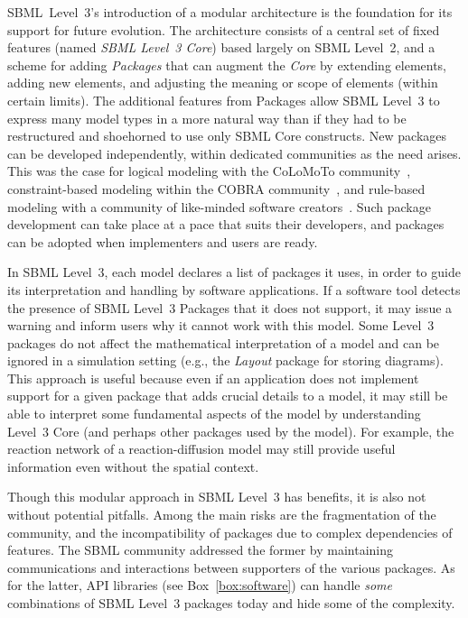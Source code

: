 \documentclass[]{draft-sbml-paper}
\begin{document}
SBML~Level~3's introduction of a modular architecture is the foundation for its support for future evolution.  The architecture consists of a central set of fixed features (named \emph{SBML Level~3 Core}) based largely on SBML Level~2, and a scheme for adding \emph{Packages} that can augment the \emph{Core} by extending elements, adding new elements, and adjusting the meaning or scope of elements (within certain limits). The additional features from Packages allow SBML Level~3 to express many model types in a more natural way than if they had to be restructured and shoehorned to use only SBML Core constructs.  New packages can be developed independently, within dedicated communities as the need arises. This was the case for logical modeling with the CoLoMoTo community~\citep{naldi2015cooperative},  constraint-based modeling within the COBRA community~\citep{Ebrahim2015}, and rule-based modeling with a community of like-minded software creators~\citep{Blinov2004, Danos2004formala, Palmisano2014multistate, Sneddon2011efficient, zhang2013simmune}. Such package development can take place at a pace that suits their developers, and packages can be adopted when implementers and users are ready.

In SBML Level~3, each model declares a list of packages it uses, in order to guide its interpretation and handling by software applications. If a software tool detects the presence of SBML Level~3 Packages that it does not support, it may issue a warning and inform users why it cannot work with this model. Some Level~3 packages do not affect the mathematical interpretation of a model and can be ignored in a simulation setting (e.g., the \emph{Layout} package for storing diagrams).  This approach is useful because even if an application does not implement support for a given package that adds crucial details to a model, it may still be able to interpret some fundamental aspects of the model by understanding Level~3 Core (and perhaps other packages used by the model). For example, the reaction network of a reaction-diffusion model may still provide useful information even without the spatial context.

Though this modular approach in SBML Level~3 has benefits, it is also not without potential pitfalls. Among the main risks are the fragmentation of the community, and the incompatibility of packages due to complex dependencies of features. The SBML community addressed the former by maintaining communications and interactions between supporters of the various packages. As for the latter, API libraries (see Box~\ref{box:software}) can handle \emph{some} combinations of SBML Level~3 packages today and hide some of the complexity.
\end{document}
